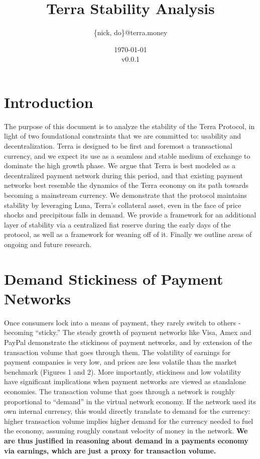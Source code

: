 \documentclass{article}
\title{Terra Stability Analysis}
\author{\{nick, do\}@terra.money}
\date{\today \\v0.0.1}
\begin{document}
\maketitle

\section{Introduction}

The purpose of this document is to analyze the stability of the Terra Protocol, in light of two foundational constraints that we are committed to: usability and decentralization. Terra is designed to be first and foremost a transactional currency, and we expect its use as a seamless and stable medium of exchange to dominate the high growth phase. We argue that Terra is best modeled as a decentralized payment network during this period, and that existing payment networks best resemble the dynamics of the Terra economy on its path towards becoming a mainstream currency. We demonstrate that the protocol maintains stability by leveraging Luna, Terra's collateral asset, even in the face of price shocks and precipitous falls in demand. We provide a framework for an additional layer of stability via a centralized fiat reserve during the early days of the protocol, as well as a framework for weaning off of it. Finally we outline areas of ongoing and future research.

\section{Demand Stickiness of Payment Networks}

Once consumers lock into a means of payment, they rarely switch to others - becoming “sticky.” The steady growth of payment networks like Visa, Amex and PayPal demonstrate the stickiness of payment networks, and by extension of the transaction volume that goes through them. The volatility of earnings for payment companies is very low, and prices are less volatile than the market benchmark (Figures 1 and 2). More importantly, stickiness and low volatility have significant implications when payment networks are viewed as standalone economies. The transaction volume that goes through a network is roughly proportional to “demand” in the virtual network economy. If the network used its own internal currency, this would directly translate to demand for the currency: higher transaction volume implies higher demand for the currency needed to fuel the economy, assuming roughly constant velocity of money in the network. \textbf{We are thus justified in reasoning about demand in a payments economy via earnings, which are just a proxy for transaction volume.}
\end{document}
